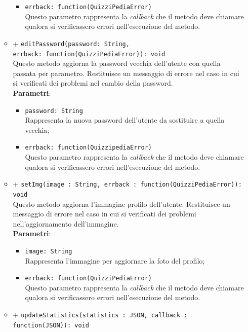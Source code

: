 \begin{itemize}
\begin{itemize}
\begin{itemize}
			\item	
				\texttt{errback: function(QuizziPediaError)} \\
				Questo parametro rappresenta la \textit{callback} che il metodo deve chiamare qualora si verificassero errori nell'esecuzione del metodo.
			\end{itemize}	
		\item	
		+ \texttt{editPassword(password: String, \\errback: function(QuizziPediaError)): void} \\
		Questo metodo aggiorna la password vecchia dell'utente con quella passata per parametro. Restituisce un messaggio di errore nel caso in cui si verificati dei problemi nel cambio della password.	\\
		\textbf{Parametri}: 
			\begin{itemize}
			\item
				\texttt{password: String} \\
				Rappresenta la nuova password dell'utente da sostituire a quella vecchia;
			\item	
				\texttt{errback: function(QuizzipediaError)} \\
				Questo parametro rappresenta la \textit{callback} che il metodo deve chiamare qualora si verificassero errori nell'esecuzione del metodo.
			\end{itemize}
		\item	
		+ \texttt{setImg(image : String, errback : function(QuizziPediaError)): void} \\	
		Questo metodo aggiorna l'immagine profilo dell'utente. Restituisce un messaggio di errore nel caso in cui si verificati dei problemi nell'aggiornamento dell'immagine.	\\	
		\textbf{Parametri}: 
			\begin{itemize}
			\item
				\texttt{image: String} \\
				Rappresenta l'immagine per aggiornare la foto del profilo;
			\item	
				\texttt{errback: function(QuizziPediaError)} \\
				Questo parametro rappresenta la \textit{callback} che il metodo deve chiamare qualora si verificassero errori nell'esecuzione del metodo.
			\end{itemize}
		\item	
		+ \texttt{updateStatistics(statistics : JSON, callback : function(JSON)): void} \\	

\end{itemize}
\end{itemize}
